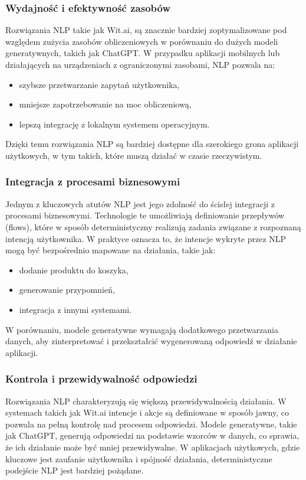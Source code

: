 \subsubsection{Wydajność i efektywność zasobów}
Rozwiązania NLP takie jak Wit.ai, są znacznie bardziej zoptymalizowane pod względem zużycia zasobów obliczeniowych w porównaniu do dużych modeli generatywnych, takich jak ChatGPT. W przypadku aplikacji mobilnych lub działających na urządzeniach z ograniczonymi zasobami, NLP pozwala na:
\begin{itemize}
    \item szybsze przetwarzanie zapytań użytkownika,
    \item mniejsze zapotrzebowanie na moc obliczeniową,
    \item lepszą integrację z lokalnym systemem operacyjnym.
\end{itemize}

Dzięki temu rozwiązania NLP są bardziej dostępne dla szerokiego grona aplikacji użytkowych, w tym takich, które muszą działać w czasie rzeczywistym.

\subsubsection{Integracja z procesami biznesowymi}

Jednym z kluczowych atutów NLP jest jego zdolność do ścisłej integracji z procesami biznesowymi. Technologie te umożliwiają definiowanie przepływów (flows), które w sposób deterministyczny realizują zadania związane z rozpoznaną intencją użytkownika. W praktyce oznacza to, że intencje wykryte przez NLP mogą być bezpośrednio mapowane na działania, takie jak:

\begin{itemize}
    \item dodanie produktu do koszyka,
    \item generowanie przypomnień,
    \item integracja z innymi systemami.
\end{itemize}
W porównaniu, modele generatywne wymagają dodatkowego przetwarzania danych, aby zinterpretować i przekształcić wygenerowaną odpowiedź w działanie aplikacji.

\subsubsection{Kontrola i przewidywalność odpowiedzi}

Rozwiązania NLP charakteryzują się większą przewidywalnością działania. W systemach takich jak Wit.ai intencje i akcje są definiowane w sposób jawny, co pozwala na pełną kontrolę nad procesem odpowiedzi. Modele generatywne, takie jak ChatGPT, generują odpowiedzi na podstawie wzorców w danych, co sprawia, że ich działanie może być mniej przewidywalne. W aplikacjach użytkowych, gdzie kluczowe jest zaufanie użytkownika i spójność działania, deterministyczne podejście NLP jest bardziej pożądane.

